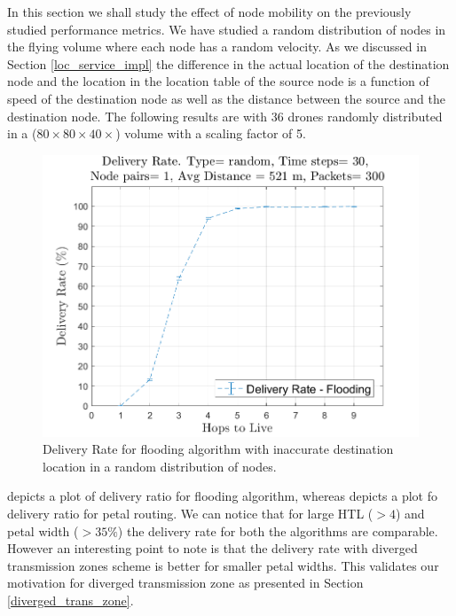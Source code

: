 In this section we shall study the effect of node mobility on the previously studied performance metrics. We have studied a random distribution of nodes in the flying volume where each node has a random velocity. As we discussed in Section \ref{loc_service_impl} the difference in the actual location of the destination node and the location in the location table of the source node is a function of speed of the destination node as well as the distance between the source and the destination node. The following results are with 36 drones randomly distributed in a ($80 \times 80 \times 40 \times$) volume with a scaling factor of 5. 

\begin{figure}[hbtp]
\centering
\includegraphics[width=\simResultFigSize\textwidth]{ncsuthesis-0.6/Chapter-5/figs/mob_fl_DR_random.png}
\caption{Delivery Rate for flooding algorithm with inaccurate destination location in a random distribution of nodes.}
\label{fig:mob_fl_DR_random}
\end{figure}

 depicts a plot of delivery ratio for flooding algorithm, whereas  depicts a plot fo delivery ratio for petal routing. We can notice that for large HTL ($> 4$) and petal width ($> 35\%$) the delivery rate for both the algorithms are comparable. However an interesting point to note is that the delivery rate with diverged transmission zones scheme is better for smaller petal widths. This validates our motivation for diverged transmission zone as presented in Section \ref{diverged_trans_zone}.


